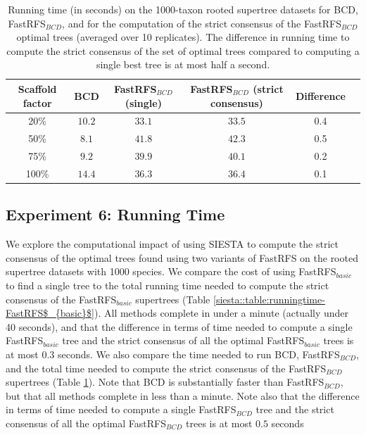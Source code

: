 \begin{table}[!ht]
\centering
\begin{tabular}{|c|c|c|c|c|c|}
\hline
 Scaffold factor & BCD & FastRFS$_{BCD}$ (single)  & FastRFS$_{BCD}$ (strict consensus)& Difference\\
\hline
\hline 
20\% &$10.2$       &$33.1$       &$33.5$ & 0.4 \\
50\%  &$8.1$        &$41.8$       &$42.3$ & 0.5 \\ 
75\% &$9.2$        &$39.9$       &$40.1$ &0.2 \\
100\% &$14.4$       &$36.3$       &$36.4$ &  0.1\\
\hline
\end{tabular}
\caption[Running times for BCD and for FastRFS$_{BCD}$ with and without SIESTA]{Running time (in seconds) on the 1000-taxon rooted supertree datasets for  BCD, FastRFS$_{BCD}$, and for the computation of the strict consensus of the
FastRFS$_{BCD}$ optimal trees (averaged over 10 replicates). The difference in running time to compute the strict consensus of the set of optimal trees compared to computing a single best tree is at most half a second.}

\label{siesta::table:runningtime-fastrfs-bcd}
\end{table}


\subsection{Experiment 6: Running Time}
We explore the  computational impact of using SIESTA  to compute the strict consensus of the optimal trees found using two variants of FastRFS  on the rooted supertree datasets with 1000 species.
We compare the cost of using FastRFS$_{basic}$ to find a single tree to the total running time needed
to compute the strict consensus of the FastRFS$_{basic}$ supertrees (Table \ref{siesta::table:runningtime-FastRFS$_{basic}$}).
All methods complete in under a minute (actually under 40 seconds), and that the difference in terms of time needed to compute a single FastRFS$_{basic}$ tree and the strict consensus of all the optimal FastRFS$_{basic}$ trees
is at most $0.3$ seconds.
We  also compare the time needed to run BCD, FastRFS$_{BCD}$, and the total time needed to compute the
strict consensus of the FastRFS$_{BCD}$ supertrees (Table \ref{siesta::table:runningtime-fastrfs-bcd}).
Note that BCD is substantially faster than FastRFS$_{BCD}$, but that all methods complete in less than a minute.
Note also that the difference in terms of time needed to compute a single FastRFS$_{BCD}$ tree and the strict consensus of all the optimal FastRFS$_{BCD}$ trees
is at most $0.5$ seconds 

